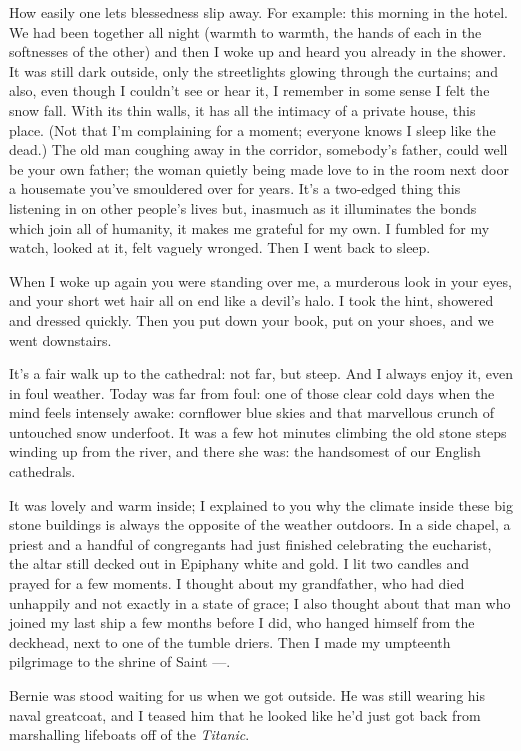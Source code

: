 How easily one lets blessedness slip away. For example: this morning in the hotel. We had been together all night (warmth to warmth, the hands of each in the softnesses of the other) and then I woke up and heard you already in the shower. It was still dark outside, only the streetlights glowing through the curtains; and also, even though I couldn't see or hear it, I remember in some sense I felt the snow fall. With its thin walls, it has all the intimacy of a private house, this place. (Not that I'm complaining for a moment; everyone knows I sleep like the dead.) The old man coughing away in the corridor, somebody's father, could well be your own father; the woman quietly being made love to in the room next door a housemate you've smouldered over for years. It's a two-edged thing this listening in on other people's lives but, inasmuch as it illuminates the bonds which join all of humanity, it makes me grateful for my own. I fumbled for my watch, looked at it, felt vaguely wronged. Then I went back to sleep.

When I woke up again you were standing over me, a murderous look in your eyes, and your short wet hair all on end like a devil's halo. I took the hint, showered and dressed quickly. Then you put down your book, put on your shoes, and we went downstairs.

It's a fair walk up to the cathedral: not far, but steep. And I always enjoy it, even in foul weather. Today was far from foul: one of those clear cold days when the mind feels intensely awake: cornflower blue skies and that marvellous crunch of untouched snow underfoot. It was a few hot minutes climbing the old stone steps winding up from the river, and there she was: the handsomest of our English cathedrals.

It was lovely and warm inside; I explained to you why the climate inside these big stone buildings is always the opposite of the weather outdoors. In a side chapel, a priest and a handful of congregants had just finished celebrating the eucharist, the altar still decked out in Epiphany white and gold. I lit two candles and prayed for a few moments. I thought about my grandfather, who had died unhappily and not exactly in a state of grace; I also thought about that man who joined my last ship a few months before I did, who hanged himself from the deckhead, next to one of the tumble driers. Then I made my umpteenth pilgrimage to the shrine of Saint ---.

Bernie was stood waiting for us when we got outside. He was still wearing his naval greatcoat, and I teased him that he looked like he'd just got back from marshalling lifeboats off of the \textit{Titanic}.

